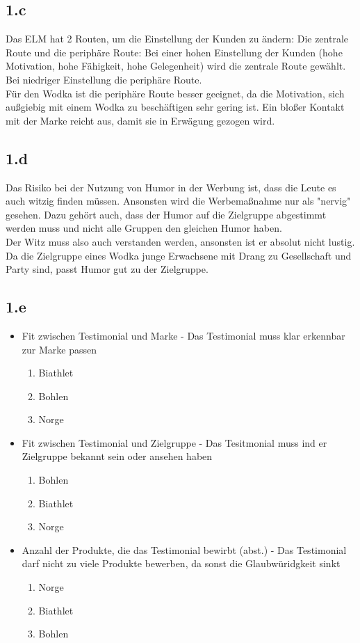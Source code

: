 \subsection{1.c}
Das ELM hat 2 Routen, um die Einstellung der Kunden zu ändern: Die zentrale Route und die periphäre Route: Bei einer hohen Einstellung der Kunden (hohe Motivation, hohe Fähigkeit, hohe Gelegenheit) wird die zentrale Route gewählt. Bei niedriger Einstellung die periphäre Route. \\
Für den Wodka ist die periphäre Route besser geeignet, da die Motivation, sich außgiebig mit einem Wodka zu beschäftigen sehr gering ist. Ein bloßer Kontakt mit der Marke reicht aus, damit sie in Erwägung gezogen wird.

\subsection{1.d}
Das Risiko bei der Nutzung von Humor in der Werbung ist, dass die Leute es auch witzig finden müssen. Ansonsten wird die Werbemaßnahme nur als "nervig" gesehen. Dazu gehört auch, dass der Humor auf die Zielgruppe abgestimmt werden muss und nicht alle Gruppen den gleichen Humor haben. \\
Der Witz muss also auch verstanden werden, ansonsten ist er absolut nicht lustig. \\
Da die Zielgruppe eines Wodka junge Erwachsene mit Drang zu Gesellschaft und Party sind, passt Humor gut zu der Zielgruppe.

\subsection{1.e}
\begin{itemize}
    \item Fit zwischen Testimonial und Marke - Das Testimonial muss klar erkennbar zur Marke passen
    \begin{enumerate}
        \item Biathlet
        \item Bohlen
        \item Norge
    \end{enumerate}
    \item Fit zwischen Testimonial und Zielgruppe - Das Tesitmonial muss ind er Zielgruppe bekannt sein oder ansehen haben
    \begin{enumerate}
        \item Bohlen
        \item Biathlet
        \item Norge
    \end{enumerate}
    \item Anzahl der Produkte, die das Testimonial bewirbt (abst.) - Das Testimonial darf nicht zu viele Produkte bewerben, da sonst die Glaubwüridgkeit sinkt
    \begin{enumerate}
        \item Norge
        \item Biathlet
        \item Bohlen
    \end{enumerate}
\end{itemize}

